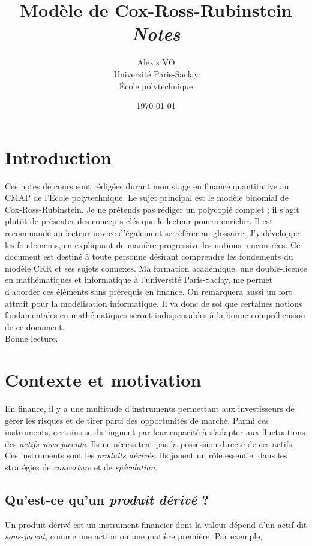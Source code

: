 \documentclass[12pt,a4paper]{article}
\title{\Huge{\textbf{Modèle de Cox-Ross-Rubinstein}}\\ \medskip
      \Huge{\textit{Notes}}\vspace*{0.7cm}}
\author{\LARGE{Alexis VO}\vspace{1cm}\\ \medskip
      Université Paris-Saclay\\École polytechnique}
\date{\vspace{0.2cm}\today}
\begin{document}
\renewcommand\labelitemi{\textbullet}

\maketitle

\newpage

\section*{Introduction}
Ces notes de cours sont rédigées durant mon stage en finance quantitative au CMAP de l'École polytechnique. Le sujet principal est le modèle binomial de Cox-Ross-Rubinstein. Je ne prétends pas rédiger un polycopié complet ; il s'agit plutôt de présenter des concepts clés que le lecteur pourra enrichir. Il est recommandé au lecteur novice d'également se référer au glossaire. J'y développe les fondements, en expliquant de manière progressive les notions rencontrées.  Ce document est destiné à toute personne désirant comprendre les fondements du modèle CRR et ses sujets connexes. Ma formation académique, une double-licence en mathématiques et informatique à l'université Paris-Saclay, me permet d'aborder ces éléments sans prérequis en finance. On remarquera aussi un fort attrait pour la modélisation informatique. Il va donc de soi que certaines notions fondamentales en mathématiques seront indispensables à la bonne compréhension de ce document.\\Bonne lecture.

\newpage

\tableofcontents

\newpage

\section{Contexte et motivation}
En finance, il y a une multitude d'instruments permettant aux investisseurs de gérer les risques et de tirer parti des opportunités de marché. Parmi ces instruments, certains se distinguent par leur capacité à s'adapter aux fluctuations des \textit{actifs sous-jacents}. Ils ne nécessitent pas la possession directe de ces actifs. Ces instruments sont les \textit{produits dérivés}. Ils jouent un rôle essentiel dans les stratégies de \textit{couverture} et de \textit{spéculation}.

\subsection{Qu'est-ce qu'un \textit{produit dérivé} ?}
Un produit dérivé est un instrument financier dont la valeur dépend d'un actif dit \textit{sous-jacent}, comme une action ou une matière première. Par exemple,
\end{document}

